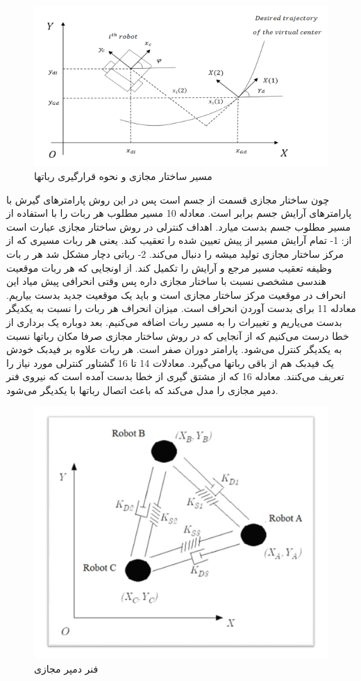 \begin{figure}[h]
	\centering
	\includegraphics[width=0.7\linewidth]{images/5}
	\caption{مسیر  ساختار مجازی و نحوه قرارگیری رباتها}
	\label{fig:5}
\end{figure}
\noindent\unskip
چون ساختار مجازی قسمت از جسم است پس در این روش پارامترهای گیرش با پارامترهای آرایش جسم برابر است.
معادله 10 مسیر مطلوب هر ربات را با استفاده از مسیر مطلوب جسم بدست میارد.
اهداف کنترلی در روش ساختار مجازی عبارت است از:
1- تمام آرایش مسیر از پیش تعیین شده را تعقیب کند. یعنی هر ربات مسیری که از مرکز ساختار مجازی تولید میشه را دنبال می‌کند.
2- رباتی دچار مشکل شد هر ر بات وظیفه تعقیب مسیر مرجع و آرایش را تکمیل کند.
از اونجایی که هر ربات موقعیت هندسی مشخصی نسبت با ساختار مجازی داره پس وقتی انحرافی پیش میاد این انحراف در موقعیت مرکز ساختار مجازی است و باید یک موقعیت جدید بدست بیاریم.
معادله 11 برای بدست آوردن انحراف است.
میزان انحراف هر ربات را نسبت به یکدیگر بدست می‌یاریم و تغییرات را به مسیر ربات اضافه می‌کنیم.
بعد دوباره یک برداری از خطا درست می‌کنیم که از آنجایی که در روش ساختار مجازی صرفا مکان رباتها نسبت به یکدیگر کنترل می‌شود. پارامتر دوران صفر است. هر ربات علاوه بر فیدبک خودش یک فیدبک هم از باقی رباتها می‌گیرد.
معادلات 14 تا 16 گشتاور کنترلی مورد نیاز را تعریف می‌کنند. معادله 16 که از مشتق گیری از خطا بدست آمده است که نیروی فنر دمپر مجازی را مدل می‌کند که باعث اتصال رباتها با یکدیگر می‌شود.

\begin{figure}[h]
	\centering
	\includegraphics[width=0.7\linewidth]{images/6}
	\caption{فنر دمپر مجازی}
	\label{fig:6}
\end{figure}
\noindent\unskip


